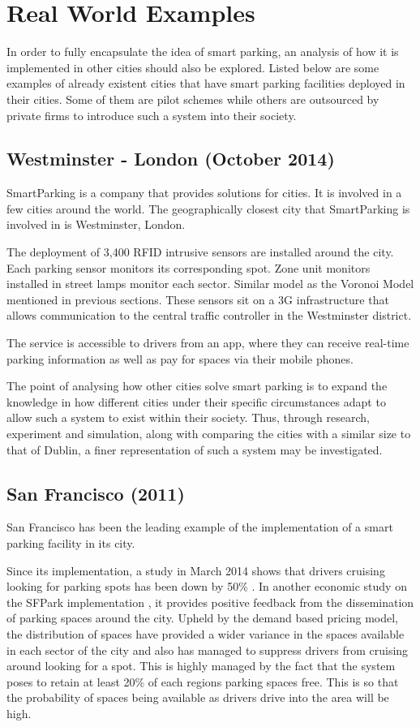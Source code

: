 \section{Real World Examples}
In order to fully encapsulate the idea of smart parking, an analysis of how it is implemented in other cities should also be explored. Listed below are some examples of already existent cities that have smart parking facilities deployed in their cities. Some of them are pilot schemes while others are outsourced by private firms to introduce such a system into their society.

\subsection*{Westminster - London (October 2014)}
SmartParking \cite{18} is a company that provides solutions for cities. It is involved in a few cities around the world. The geographically closest city that SmartParking is involved in is Westminster, London.

The deployment of 3,400 RFID intrusive sensors are installed around the city. Each parking sensor monitors its corresponding spot. Zone unit monitors installed in street lamps monitor each sector. Similar model as the Voronoi Model mentioned in previous sections. These sensors sit on a 3G infrastructure that allows communication to the central traffic controller in the Westminster district. 

The service is accessible to drivers from an app, where they can receive real-time parking information as well as pay for spaces via their mobile phones.

The point of analysing how other cities solve smart parking is to expand the knowledge in how different cities under their specific circumstances adapt to allow such a system to exist within their society. Thus, through research, experiment and simulation, along with comparing the cities with a similar size to that of Dublin, a finer representation of such a system may be investigated.

\subsection*{San Francisco (2011)}
San Francisco has been the leading example of the implementation of a smart parking facility in its city.

Since its implementation, a study in March 2014 shows that drivers cruising looking for parking spots has been down by 50\% \cite{19}. In another economic study on the SFPark implementation \cite{20}, it provides positive feedback from the dissemination of parking spaces around the city. Upheld by the demand based pricing model, the distribution of spaces have provided a wider variance in the spaces available in each sector of the city and also has managed to suppress drivers from cruising around looking for a spot. This is highly managed by the fact that the system poses to retain at least 20\% of each regions parking spaces free. This is so that the probability of spaces being available as drivers drive into the area will be high.